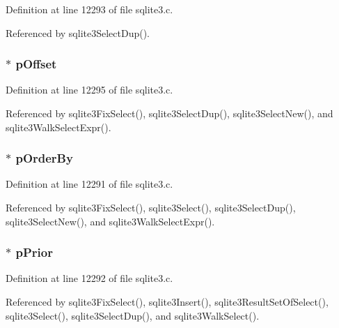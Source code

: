 Definition at line 12293 of file sqlite3.\+c.



Referenced by sqlite3\+Select\+Dup().

\hypertarget{struct_select_aeca6406d3cede0e3423dde49f008567b}{}
\subsubsection[{p\+Offset}]{$\ast$ p\+Offset}\label{struct_select_aeca6406d3cede0e3423dde49f008567b}


Definition at line 12295 of file sqlite3.\+c.



Referenced by sqlite3\+Fix\+Select(), sqlite3\+Select\+Dup(), sqlite3\+Select\+New(), and sqlite3\+Walk\+Select\+Expr().

\hypertarget{struct_select_a9150e506e5902e336130c9764caf96a0}{}
\subsubsection[{p\+Order\+By}]{$\ast$ p\+Order\+By}\label{struct_select_a9150e506e5902e336130c9764caf96a0}


Definition at line 12291 of file sqlite3.\+c.



Referenced by sqlite3\+Fix\+Select(), sqlite3\+Select(), sqlite3\+Select\+Dup(), sqlite3\+Select\+New(), and sqlite3\+Walk\+Select\+Expr().

\hypertarget{struct_select_a380ce35e11c269ed7950cba7dffe2934}{}
\subsubsection[{p\+Prior}]{$\ast$ p\+Prior}\label{struct_select_a380ce35e11c269ed7950cba7dffe2934}


Definition at line 12292 of file sqlite3.\+c.



Referenced by sqlite3\+Fix\+Select(), sqlite3\+Insert(), sqlite3\+Result\+Set\+Of\+Select(), sqlite3\+Select(), sqlite3\+Select\+Dup(), and sqlite3\+Walk\+Select().

